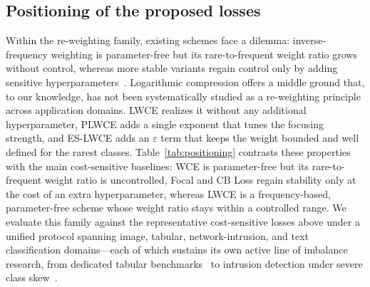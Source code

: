\documentclass[a4paper,fleqn]{cas-sc}
\begin{document}
\subsection{Positioning of the proposed losses}
Within the re-weighting family, existing schemes face a dilemma: inverse-frequency
weighting is parameter-free but its rare-to-frequent weight ratio grows without
control, whereas more stable variants regain control only by adding sensitive
hyperparameters~\citep{lin2017,cui2019}. Logarithmic compression offers a middle
ground that, to our knowledge, has not been systematically studied as a
re-weighting principle across application domains. LWCE realizes it without any
additional hyperparameter, PLWCE adds a single exponent that tunes the focusing
strength, and ES-LWCE adds an $\varepsilon$ term that keeps the weight bounded and
well defined for the rarest classes. Table~\ref{tab:positioning} contrasts these
properties with the main cost-sensitive baselines: WCE is parameter-free but its
rare-to-frequent weight ratio is uncontrolled, Focal and CB Loss regain stability
only at the cost of an extra hyperparameter, whereas LWCE is a frequency-based,
parameter-free scheme whose weight ratio stays within a controlled range. We
evaluate this family against the representative cost-sensitive losses above under a
unified protocol spanning image, tabular, network-intrusion, and text
classification domains---each of which sustains its own active line of imbalance
research, from dedicated tabular benchmarks~\citep{climb2025} to intrusion
detection under severe class skew~\citep{abdelkhalek2023}.
\end{document}
